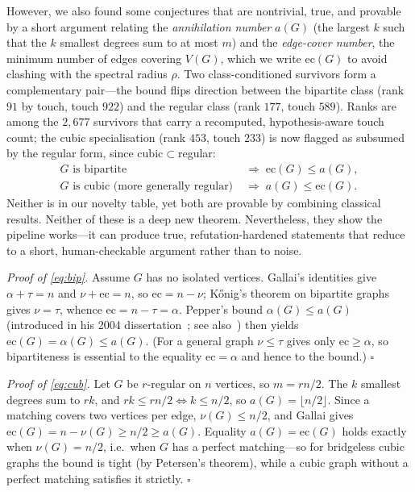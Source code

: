 \documentclass[]{ceurart}
\begin{document}
However, we also found some conjectures that are nontrivial, true, and provable by a short argument relating the \emph{annihilation number}
$a(G)$ (the largest $k$ such that the $k$ smallest degrees sum to at most $m$) and the \emph{edge-cover
number}, the minimum number of edges covering $V(G)$, which we write $\mathrm{ec}(G)$ to avoid clashing
with the spectral radius $\rho$. Two class-conditioned survivors form a complementary pair---the bound
flips direction between the bipartite class (rank $91$ by touch, touch $922$) and the regular
class (rank $177$, touch $589$). Ranks are among the $2{,}677$ survivors that carry a
recomputed, hypothesis-aware touch count; the cubic specialisation (rank $453$, touch $233$)
is now flagged as subsumed by the regular form, since \textsf{cubic}$\subset$\textsf{regular}:
\begin{align}
  G \text{ is bipartite} &\;\Rightarrow\; \mathrm{ec}(G) \le a(G), \label{eq:bip}\\
  G \text{ is cubic (more generally regular)} &\;\Rightarrow\; a(G) \le \mathrm{ec}(G). \label{eq:cub}
\end{align}
Neither is in our novelty table, yet both are provable by combining classical results. Neither of these is a deep new theorem. Nevertheless, they show the pipeline works---it can produce true,
refutation-hardened statements that reduce to a short, human-checkable argument rather than to noise. 

\smallskip\noindent\textit{Proof of \eqref{eq:bip}.}
Assume $G$ has no isolated vertices. Gallai's identities give $\alpha+\tau=n$ and $\nu+\mathrm{ec}=n$, so
$\mathrm{ec}=n-\nu$; K\H{o}nig's theorem on bipartite graphs gives $\nu=\tau$, whence
$\mathrm{ec}=n-\tau=\alpha$. Pepper's bound $\alpha(G)\le a(G)$ (introduced in his 2004 dissertation~\cite{pepper2004thesis}; see also~\cite{pepper2009}) then yields
$\mathrm{ec}(G)=\alpha(G)\le a(G)$. (For a general graph $\nu\le\tau$ gives only $\mathrm{ec}\ge\alpha$, so
bipartiteness is essential to the equality $\mathrm{ec}=\alpha$ and hence to the bound.) \hfill$\square$

\smallskip\noindent\textit{Proof of \eqref{eq:cub}.}
Let $G$ be $r$-regular on $n$ vertices, so $m=rn/2$. The $k$ smallest degrees sum to $rk$, and $rk\le
rn/2 \iff k\le n/2$, so $a(G)=\lfloor n/2\rfloor$. Since a matching covers two vertices per edge,
$\nu(G)\le n/2$, and Gallai gives $\mathrm{ec}(G)=n-\nu(G)\ge n/2\ge a(G)$. Equality $a(G)=\mathrm{ec}(G)$
holds exactly when $\nu(G)=n/2$, i.e.\ when $G$ has a perfect matching---so for bridgeless cubic graphs
the bound is tight (by Petersen's theorem), while a cubic graph without a perfect matching satisfies it
strictly. \hfill$\square$
\end{document}
